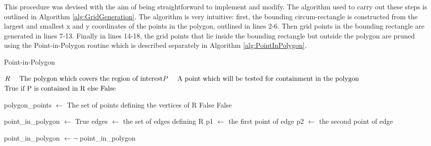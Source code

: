 This procedure was devised with the aim of being straightforward to implement and modify. The algorithm used to carry out these steps is outlined in Algorithm \ref{alg:GridGeneration}. The algorithm is very intuitive: first, the bounding circum-rectangle is constructed from the largest and smallest x and y coordinates of the points in the polygon, outlined in lines 2-6. Then grid points in the bounding rectangle are generated in lines 7-13. Finally in lines 14-18, the grid points that lie inside the bounding rectangle but outside the polygon are pruned using the Point-in-Polygon routine which is described separately in Algorithm \ref{alg:PointInPolygon}. 


\begin{algorithm}{}
\caption{Point-in-Polygon}
\label{alg:PointInPolygon}
\begin{algorithmic}[1]
\renewcommand{\algorithmicrequire}{\textbf{Input:}}
\renewcommand{\algorithmicensure}{\textbf{Output:}}
\REQUIRE $ \newline R \quad \text{ The polygon which covers the region of interest}
\newline P \quad \text{ A point which will be tested for containment in the polygon }
$
\ENSURE $\newline \text{True if P is contained in R else False }$

\hfill\pagebreak
\STATE polygon\_points $\leftarrow$ The set of points defining the vertices of R
\RETURN False
\RETURN False



\ELSE
\STATE point\_in\_polygon $\leftarrow$ True
\STATE edges $\leftarrow$ the set of edges defining R
\STATE p1 $\leftarrow$ the first point of edge
\STATE p2 $\leftarrow$ the second point of edge

\STATE point\_in\_polygon $\leftarrow \neg$ point\_in\_polygon
\ENDIF

\ENDFOR
\ENDIF
\end{algorithmic} 
\end{algorithm}


